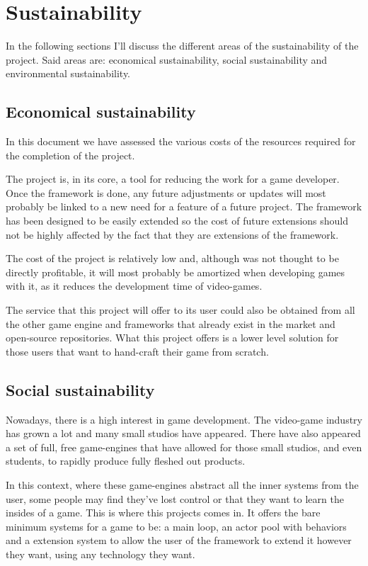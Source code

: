 \section{Sustainability}

In the following sections I'll discuss the different areas of the sustainability of 
the project. Said areas are: economical sustainability, social sustainability and 
environmental sustainability.

\subsection{Economical sustainability}

In this document we have assessed the various costs of the resources required for 
the completion of the project.

The project is, in its core, a tool for reducing the work for a game developer. Once 
the framework is done, any future adjustments or updates will most probably be linked 
to a new need for a feature of a future project. The framework has been designed to 
be easily extended so the cost of future extensions should not be highly affected 
by the fact that they are extensions of the framework.

The cost of the project is relatively low and, although was not thought to be directly 
profitable, it will most probably be amortized when developing games with it, as it 
reduces the development time of video-games.

The service that this project will offer to its user could also be obtained from all 
the other game engine and frameworks that already exist in the market and open-source 
repositories. What this project offers is a lower level solution for those users that 
want to hand-craft their game from scratch.

\subsection{Social sustainability}

Nowadays, there is a high interest in game development. The video-game industry has 
grown a lot and many small studios have appeared. There have also appeared a set of 
full, free game-engines that have allowed for those small studios, and even students, 
to rapidly produce fully fleshed out products.

In this context, where these game-engines abstract all the inner systems from the 
user, some people may find they've lost control or that they want to learn the insides 
of a game. This is where this projects comes in. It offers the bare minimum systems 
for a game to be: a main loop, an actor pool with behaviors and a extension system 
to allow the user of the framework to extend it however they want, using any technology 
they want.


